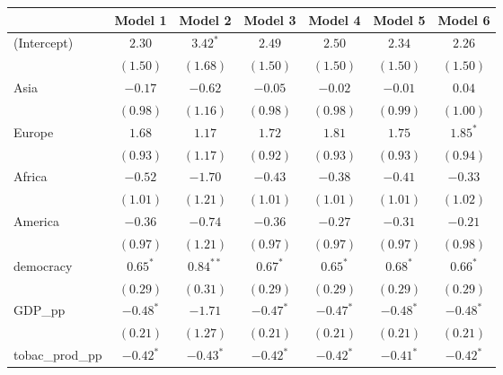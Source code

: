 
\begin{table}[!h]
\begin{center}
\begin{tabular}{l c c c c c c }
\toprule
 & Model 1 & Model 2 & Model 3 & Model 4 & Model 5 & Model 6 \\
\midrule
(Intercept)             & $2.30$       & $3.42^{*}$   & $2.49$       & $2.50$       & $2.34$       & $2.26$       \\
                        & $(1.50)$     & $(1.68)$     & $(1.50)$     & $(1.50)$     & $(1.50)$     & $(1.50)$     \\
Asia                    & $-0.17$      & $-0.62$      & $-0.05$      & $-0.02$      & $-0.01$      & $0.04$       \\
                        & $(0.98)$     & $(1.16)$     & $(0.98)$     & $(0.98)$     & $(0.99)$     & $(1.00)$     \\
Europe                  & $1.68$       & $1.17$       & $1.72$       & $1.81$       & $1.75$       & $1.85^{*}$   \\
                        & $(0.93)$     & $(1.17)$     & $(0.92)$     & $(0.93)$     & $(0.93)$     & $(0.94)$     \\
Africa                  & $-0.52$      & $-1.70$      & $-0.43$      & $-0.38$      & $-0.41$      & $-0.33$      \\
                        & $(1.01)$     & $(1.21)$     & $(1.01)$     & $(1.01)$     & $(1.01)$     & $(1.02)$     \\
America                 & $-0.36$      & $-0.74$      & $-0.36$      & $-0.27$      & $-0.31$      & $-0.21$      \\
                        & $(0.97)$     & $(1.21)$     & $(0.97)$     & $(0.97)$     & $(0.97)$     & $(0.98)$     \\
democracy               & $0.65^{*}$   & $0.84^{**}$  & $0.67^{*}$   & $0.65^{*}$   & $0.68^{*}$   & $0.66^{*}$   \\
                        & $(0.29)$     & $(0.31)$     & $(0.29)$     & $(0.29)$     & $(0.29)$     & $(0.29)$     \\
GDP\_pp                 & $-0.48^{*}$  & $-1.71$      & $-0.47^{*}$  & $-0.47^{*}$  & $-0.48^{*}$  & $-0.48^{*}$  \\
                        & $(0.21)$     & $(1.27)$     & $(0.21)$     & $(0.21)$     & $(0.21)$     & $(0.21)$     \\
tobac\_prod\_pp         & $-0.42^{*}$  & $-0.43^{*}$  & $-0.42^{*}$  & $-0.42^{*}$  & $-0.41^{*}$  & $-0.42^{*}$  \\

\end{tabular}
\end{center}
\end{table}
